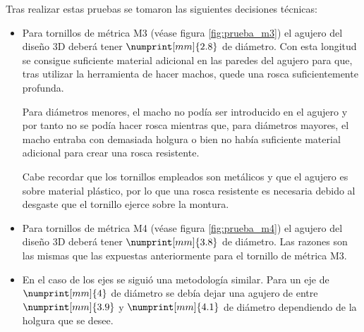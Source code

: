


Tras realizar estas pruebas se tomaron las siguientes decisiones técnicas:

\begin{itemize}
    \item Para tornillos de métrica M3 (véase figura \ref{fig:prueba_m3}) el agujero del diseño 3D deberá tener $\numprint[mm]{2.8}$ de diámetro. Con esta longitud se consigue suficiente material adicional en las paredes del agujero para que, tras utilizar la herramienta de hacer machos, quede una rosca suficientemente profunda.

    Para diámetros menores, el macho no podía ser introducido en el agujero y por tanto no se podía hacer rosca mientras que, para diámetros mayores, el macho entraba con demasiada holgura o bien no había suficiente material adicional para crear una rosca resistente.
    
    Cabe recordar que los tornillos empleados son metálicos y que el agujero es sobre material plástico, por lo que una rosca resistente es necesaria debido al desgaste que el tornillo ejerce sobre la montura.
    \item Para tornillos de métrica M4 (véase figura \ref{fig:prueba_m4}) el agujero del diseño 3D deberá tener $\numprint[mm]{3.8}$ de diámetro. Las razones son las mismas que las expuestas anteriormente para el tornillo de métrica M3.
    \item En el caso de los ejes se siguió una metodología similar.
    Para un eje de $\numprint[mm]{4}$ de diámetro se debía dejar una agujero de entre $\numprint[mm]{3.9}$ y $\numprint[mm]{4.1}$ de diámetro dependiendo de la holgura que se desee.    
\end{itemize}


